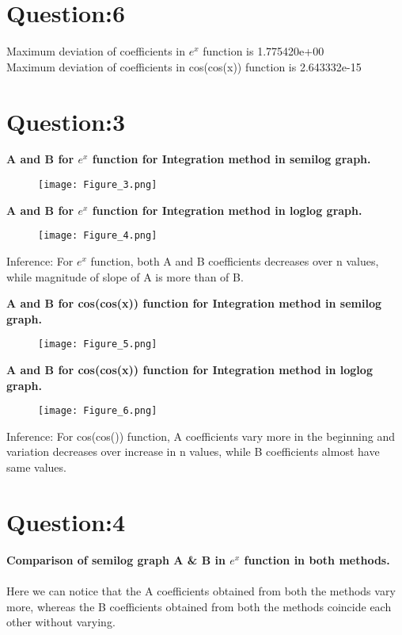\documentclass[12pt]{article}
\begin{document}
\section*{Question:6}
Maximum deviation of coefficients in $e^x$ function is 1.775420e+00\\
Maximum deviation of coefficients in cos(cos(x)) function is 2.643332e-15

\newpage
\section*{Question:3}

\textbf{A and B for $e^x$ function for Integration method in semilog graph.}

\begin{figure}[h!]
\centering
\texttt{[image: Figure\_3.png]}
\label{fig:exemplo}
\end{figure}

\textbf{A and B for $e^x$ function for Integration method in loglog graph.}

\begin{figure}[h!]
\centering
\texttt{[image: Figure\_4.png]}
\label{fig:exemplo}
\end{figure}
Inference: For $e^x$ function, both A and B coefficients decreases over n values, while magnitude of slope of A is more than of B.  
\newpage

\newpage
\textbf{A and B for cos(cos(x)) function for Integration method in semilog graph.}

\begin{figure}[h!]
\centering
\texttt{[image: Figure\_5.png]}
\label{fig:exemplo}
\end{figure}

\textbf{A and B for cos(cos(x)) function for Integration method in loglog graph.}

\begin{figure}[h!]
\centering
\texttt{[image: Figure\_6.png]}
\label{fig:exemplo}
\end{figure}
Inference: For cos(cos()) function, A coefficients vary more in the beginning and variation decreases over increase in n values, while B coefficients almost have same values.
\newpage
\section*{Question:4}

\textbf{Comparison of semilog graph A \& B in $e^x$ function in both methods.}\\\\
Here we can notice that the A coefficients obtained from both the methods vary more, whereas the B coefficients obtained from both the methods coincide each other without varying.
\end{document}
